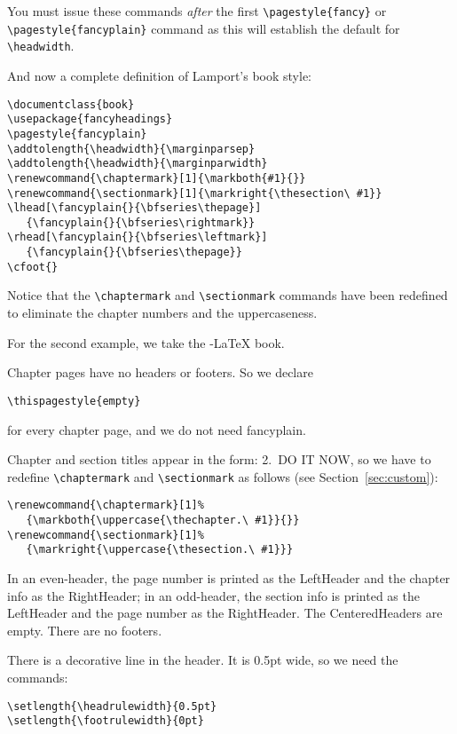 \documentclass{article}
\def\latex/{\protect\LaTeX{}}
\def\ams/{\protect\pAmS}
\def\pAmS{{\the\textfont2
        A\kern-.1667em\lower.5ex\hbox{M}\kern-.125emS}}
\def\amslatex/{\ams/-\latex/}
\begin{document}
\begin{flushleft}
You must issue these commands \emph{after} the first
\verb|\pagestyle{fancy}| or \verb|\pagestyle{fancyplain}| command as this
will establish the default for \verb|\headwidth|.
\end{flushleft}

And now a complete definition of Lamport's book style:

\begin{verbatim}
\documentclass{book}
\usepackage{fancyheadings}
\pagestyle{fancyplain}
\addtolength{\headwidth}{\marginparsep}
\addtolength{\headwidth}{\marginparwidth}
\renewcommand{\chaptermark}[1]{\markboth{#1}{}}
\renewcommand{\sectionmark}[1]{\markright{\thesection\ #1}}
\lhead[\fancyplain{}{\bfseries\thepage}]
   {\fancyplain{}{\bfseries\rightmark}}
\rhead[\fancyplain{}{\bfseries\leftmark}]
   {\fancyplain{}{\bfseries\thepage}}
\cfoot{}
\end{verbatim}

Notice that the \verb|\chaptermark| and \verb|\sectionmark| commands have
been redefined to eliminate the chapter numbers and the uppercaseness.

For the second example, we take the \amslatex/ book.%

Chapter pages have no headers or footers.  So we declare

\begin{verbatim}
\thispagestyle{empty}
\end{verbatim}
for every chapter page, and we do not need fancyplain.

Chapter and section titles appear in the form: 2.\ DO IT NOW, so we have
to redefine \verb|\chaptermark| and \verb|\sectionmark| as follows (see
Section~\ref{sec:custom}):

\begin{verbatim}
\renewcommand{\chaptermark}[1]%
   {\markboth{\uppercase{\thechapter.\ #1}}{}}
\renewcommand{\sectionmark}[1]%
   {\markright{\uppercase{\thesection.\ #1}}}
\end{verbatim}

In an even-header, the page number is printed as the LeftHeader and
the chapter info as the RightHeader; in an odd-header, the section info
is printed as the LeftHeader and the page number as the RightHeader.  The
CenteredHeaders are empty.  There are no footers.

There is a decorative line in the header.  It is 0.5pt wide, so we need
the commands:

\begin{verbatim}
\setlength{\headrulewidth}{0.5pt}
\setlength{\footrulewidth}{0pt}
\end{verbatim}
\end{document}
